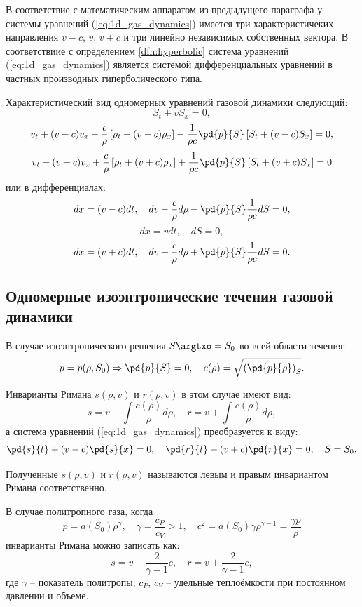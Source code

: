 \documentclass[14pt]{extarticle}
\begin{document}
В соответствие с математическим аппаратом из предыдущего параграфа у системы уравнений (\ref{eq:1d_gas_dynamics}) имеется три характеристичеких направления $v-c$, $v$, $v+c$ и три линейно независимых собственных вектора. В соответствиие с определением \ref{dfn:hyperbolic} система уравнений (\ref{eq:1d_gas_dynamics}) является системой дифференциальных уравнений в частных производных \alert{гиперболического типа}.

Характеристический вид одномерных уравнений газовой динамики следующий:
\[
S_t + v S_x = 0,
\]
\[
v_t + (v-c)v_x -
\frac{c}{\rho} \left[\rho_t + (v-c)\rho_x	\right]-
\frac{1}{\rho c} \pd{p}{S}\left[ S_t + (v-c) S_x \right] = 0,
\]
\[
v_t + (v+c)v_x +
\frac{c}{\rho} \left[\rho_t + (v+c)\rho_x	\right] +
\frac{1}{\rho c} \pd{p}{S}\left[ S_t + (v+c) S_x \right] = 0
\]
или в дифференциалах:
\[
	dx = (v-c) dt, \quad dv - \frac{c}{\rho} d\rho - \pd{p}{S}\frac{1}{\rho c} dS = 0,
\]
\[
	dx = v dt,\quad dS  = 0,
\]
\[
	dx = (v+c) dt, \quad dv + \frac{c}{\rho} d\rho + \pd{p}{S}\frac{1}{\rho c} dS = 0.
\]

\subsection{Одномерные изоэнтропические течения газовой динамики}

В случае изоэнтропического решения  $S\argtxo = S_0$ во всей области течения: 
\[
	p = p(\rho, S_0) \Rightarrow \pd{p}{S} = 0, \quad c(\rho) = \sqrt{\left(\pd{p}{\rho}\right)_S}.
\]
		
		
Инварианты Римана $s(\rho,v)$ и $r(\rho,v)$ в этом случае имеют вид:
\[
s = v - \int\frac{c(\rho)}{\rho} d\rho,\quad
r = v + \int\frac{c(\rho)}{\rho} d\rho,
\]
а система уравнений (\ref{eq:1d_gas_dynamics}) преобразуется к виду:			
\[
\pd{s}{t} + (v-c) \pd{s}{x} = 0,\quad \pd{r}{t} + (v+c) \pd{r}{x} = 0, \quad S=S_0.
\]

Полученные $s(\rho,v)$ и $r(\rho,v)$ называются левым и правым инвариантом Римана соответственно.
			


В случае политропного газа, когда
\begin{equation}
	\label{eq:polytrop_dfn}
	p = a(S_0) \rho^\gamma,\quad \gamma = \frac{c_P}{c_V} > 1,\quad
	c^2 = a(S_0)\gamma \rho^{\gamma-1} = \frac{\gamma p}{\rho}
\end{equation}
инварианты Римана можно записать как:
\[
	s =  
	v- \frac{2}{\gamma-1}c,\quad
	r = 
	v + \frac{2}{\gamma-1}c,
\]
где $\gamma$ -- показатель политропы; $c_P$, $c_V$ -- удельные теплоёмкости при постоянном давлении и объеме.
	
\end{document}
